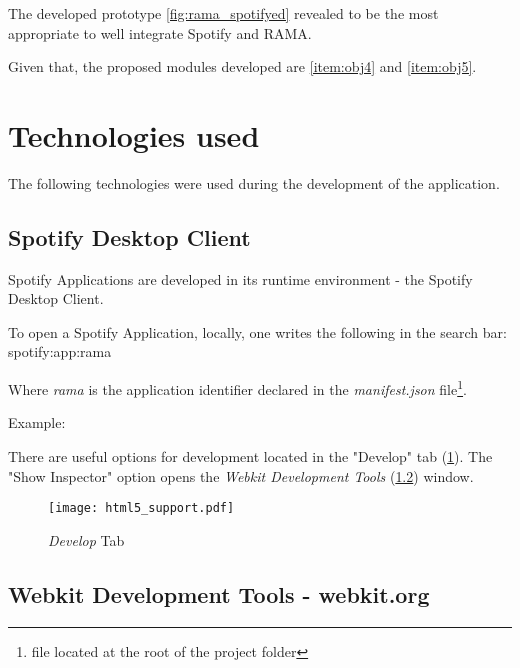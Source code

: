     The developed prototype \ref{fig:rama_spotifyed} revealed to be the most appropriate to well integrate Spotify and RAMA.

    Given that, the proposed modules developed are \ref{item:obj4} and \ref{item:obj5}.



\section{Technologies used} %
\label{sec:technologies}

  The following technologies were used during the development of the application.

  \subsection{Spotify Desktop Client} %
  \label{sub:subsection_name}
    Spotify Applications are developed in its runtime environment - the Spotify Desktop Client.

    To open a Spotify Application, locally, one writes the following in the search bar: spotify:app:rama

    Where \emph{rama} is the application identifier declared in the \emph{manifest.json} file\footnote{file located at the root of the project folder}.

    Example:

    

    There are useful options for development located in the "Develop" tab (\ref{fig:html5_support}).
    The "Show Inspector" option opens the \emph{Webkit Development Tools} (\ref{sub:webkit_tools}) window.

    \begin{figure}[tb]
      \begin{center}
        \texttt{[image: html5\_support.pdf]}
      \end{center}
      \caption{\emph{Develop} Tab}
      \label{fig:html5_support}
    \end{figure}
  
  \subsection{Webkit Development Tools - webkit.org} %
  \label{sub:webkit_tools}

